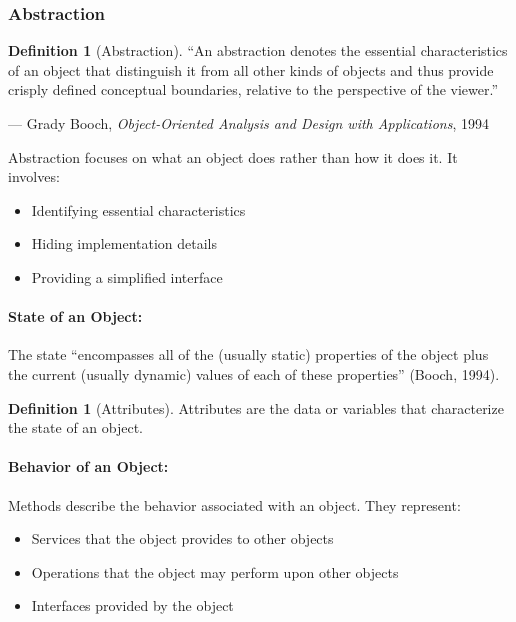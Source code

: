 \documentclass[11pt, a4paper, notitlepage]{report}
\theoremstyle{definition}
\newtheorem{definition}[theorem]{Definition}
\theoremstyle{remark}
\theoremstyle{definition}
\begin{document}
\subsubsection{Abstraction}

\begin{definition}[Abstraction]
\label{def:ch1-abstraction}
``An abstraction denotes the essential characteristics of an object that distinguish it from all other kinds of objects and thus provide crisply defined conceptual boundaries, relative to the perspective of the viewer.''
\begin{flushright}
--- Grady Booch, \emph{Object-Oriented Analysis and Design with Applications}, 1994
\end{flushright}
\end{definition}

Abstraction focuses on what an object does rather than how it does it. It involves:
\begin{itemize}
  \item Identifying essential characteristics
  \item Hiding implementation details
  \item Providing a simplified interface
\end{itemize}

\paragraph{State of an Object:}
The state ``encompasses all of the (usually static) properties of the object plus the current (usually dynamic) values of each of these properties'' (Booch, 1994).

\begin{definition}[Attributes]
\label{def:ch1-attributes}
Attributes are the data or variables that characterize the state of an object.
\end{definition}

\paragraph{Behavior of an Object:}
Methods describe the behavior associated with an object. They represent:
\begin{itemize}
  \item Services that the object provides to other objects
  \item Operations that the object may perform upon other objects
  \item Interfaces provided by the object
\end{itemize}
\end{document}
